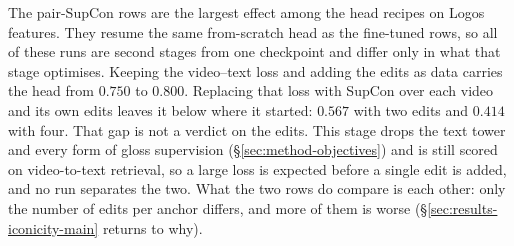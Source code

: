 The pair-SupCon rows are the largest effect among the head recipes on
Logos features. They resume the same from-scratch head as the
fine-tuned rows, so all of these runs are second stages from one
checkpoint and differ only in what that stage optimises. Keeping the
video--text loss and adding the edits as data carries the head from
$0.750$ to $0.800$. Replacing that loss with SupCon over each video and
its own edits leaves it below where it started: $0.567$ with two edits
and $0.414$ with four. That gap is not a verdict on the edits. This stage
drops the text tower and every form of gloss supervision
(\S\ref{sec:method-objectives}) and is still scored on video-to-text
retrieval, so a large loss is expected before a single edit is added, and
no run separates the two. What the two rows do compare is each other:
only the number of edits per anchor differs, and more of them is worse
(\S\ref{sec:results-iconicity-main} returns to why).

